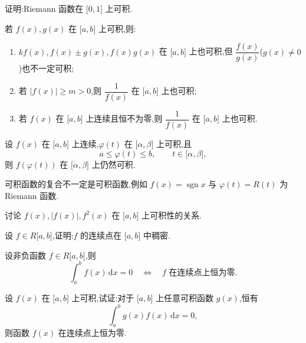 \documentclass[../数学分析培优讲义.tex]{subfiles}
\begin{document}
\begin{example}[\markstar]
证明:Riemann 函数在 $\lbrack 0,1\rbrack$ 上可积.
\end{example}
\exampleblank

\begin{theorem}
若 $f(x),g(x)$ 在 $\lbrack a,b\rbrack$ 上可积,则:
\begin{enumerate}[label=(\arabic*)]
    \item $kf(x),f(x)\pm g(x),f(x)g(x)$ 在 $\lbrack a,b\rbrack$ 上也可积,但 $\dfrac{f(x)}{g(x)}$($g(x)\neq0$)也不一定可积;
    \item 若 $|f(x)|\geq m>0$,则 $\dfrac{1}{f(x)}$ 在 $\lbrack a,b\rbrack$ 上也可积;
    \item 若 $f(x)$ 在 $\lbrack a,b\rbrack$ 上连续且恒不为零,则 $\dfrac{1}{f(x)}$ 在 $\lbrack a,b\rbrack$ 上也可积.
\end{enumerate}
\end{theorem}

\begin{example}[\markstar\ 复合]
设 $f(x)$ 在 $\lbrack a,b\rbrack$ 上连续,$\varphi(t)$ 在 $\lbrack \alpha,\beta\rbrack$ 上可积,且
\[
    a\leq\varphi(t)\leq b,
    \qquad t\in\lbrack \alpha,\beta\rbrack,
\]
则 $f(\varphi(t))$ 在 $\lbrack \alpha,\beta\rbrack$ 上仍然可积.
\end{example}
\exampleblank

\begin{remark}
可积函数的复合不一定是可积函数,例如 $f(x)=\operatorname{sgn}x$ 与 $\varphi(t)=R(t)$ 为 Riemann 函数.
\end{remark}

\begin{example}[\markstar]
讨论 $f(x),|f(x)|,f^2(x)$ 在 $\lbrack a,b\rbrack$ 上可积性的关系.
\end{example}
\exampleblank

\begin{proposition}[\markstar]
设 $f\in R\lbrack a,b\rbrack$,证明:$f$ 的连续点在 $\lbrack a,b\rbrack$ 中稠密.
\end{proposition}

\begin{corollary}[\markstar]
设非负函数 $f\in R\lbrack a,b\rbrack$,则
\[
    \int_a^b f(x)\,\mathrm{d}x=0
    \quad\Longleftrightarrow\quad
    f\text{ 在连续点上恒为零}.
\]
\end{corollary}

\begin{example}
设 $f(x)$ 在 $\lbrack a,b\rbrack$ 上可积,试证:对于 $\lbrack a,b\rbrack$ 上任意可积函数 $g(x)$,恒有
\[
    \int_a^b g(x)f(x)\,\mathrm{d}x=0,
\]
则函数 $f(x)$ 在连续点上恒为零.
\end{example}
\exampleblank
\end{document}
